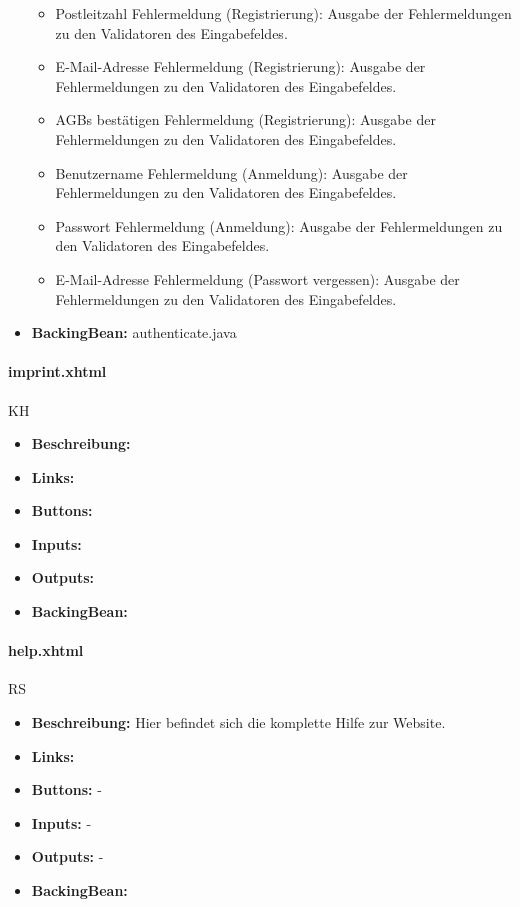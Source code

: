 \begin{itemize}
\begin{itemize}
							\item Postleitzahl Fehlermeldung (Registrierung): Ausgabe der Fehlermeldungen zu den Validatoren des Eingabefeldes.
							\item E-Mail-Adresse Fehlermeldung (Registrierung): Ausgabe der Fehlermeldungen zu den Validatoren des Eingabefeldes.
							\item AGBs bestätigen Fehlermeldung (Registrierung): Ausgabe der Fehlermeldungen zu den Validatoren des Eingabefeldes.
							\item Benutzername Fehlermeldung (Anmeldung): Ausgabe der Fehlermeldungen zu den Validatoren des Eingabefeldes.
							\item Passwort Fehlermeldung (Anmeldung): Ausgabe der Fehlermeldungen zu den Validatoren des Eingabefeldes.
							\item E-Mail-Adresse Fehlermeldung (Passwort vergessen): Ausgabe der Fehlermeldungen zu den Validatoren des Eingabefeldes.
						\end{itemize}
					\item \textbf{BackingBean:} authenticate.java
				\end{itemize}
				
				\paragraph{imprint.xhtml}
					KH\\
					\begin{itemize}
						\item \textbf{Beschreibung:}
						\item \textbf{Links:}
						\item \textbf{Buttons:}
						\item \textbf{Inputs:}
						\item \textbf{Outputs:}
						\item \textbf{BackingBean:}
					\end{itemize}
				
				
				\paragraph{help.xhtml}
					RS\\
					\begin{itemize}
						\item \textbf{Beschreibung:} Hier befindet sich die komplette Hilfe zur Website.
						\item \textbf{Links:}
						\item \textbf{Buttons:} -
						\item \textbf{Inputs:} -
						\item \textbf{Outputs:} -
						\item \textbf{BackingBean:}
					\end{itemize}
				
